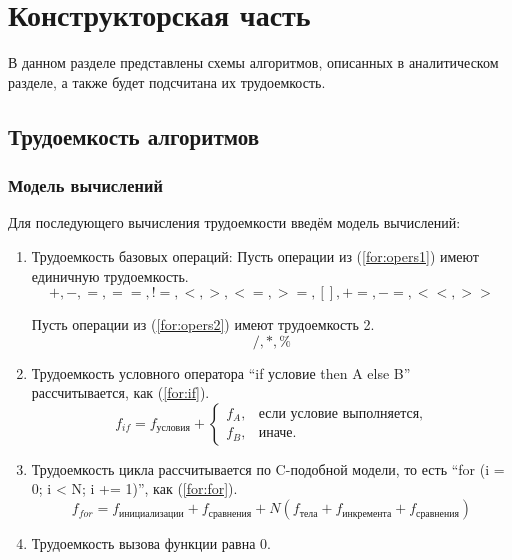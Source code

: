 \chapter{Конструкторская часть}
В данном разделе представлены схемы алгоритмов, описанных в
аналитическом разделе, а также будет подсчитана их трудоемкость.
\section{Трудоемкость алгоритмов}

\subsection{Модель вычислений}

Для последующего вычисления трудоемкости введём модель вычислений:
\begin{enumerate}
	\item Трудоемкость базовых операций:
	Пусть операции из (\ref{for:opers1}) имеют единичную трудоемкость.
	\begin{equation}
	\label{for:opers1}
	+, -, =, ==, !=, <, >, <=, >=, [], +=, -=, <<, >>
	\end{equation}
	
	Пусть операции из (\ref{for:opers2}) имеют трудоемкость 2.
	\begin{equation}
	\label{for:opers2}
	/, *, \%
	\end{equation}
		
	\item Трудоемкость условного оператора ``if условие then A else B'' рассчитывается, как (\ref{for:if}).
	\begin{equation}
	\label{for:if}
	f_{if} = f_{\text{условия}} +
	\begin{cases}
	f_A, & \text{если условие выполняется,}\\
	f_B, & \text{иначе.}
	\end{cases}
	\end{equation}

	\item Трудоемкость цикла рассчитывается по C-подобной модели, то есть ``for (i = 0; i < N; i += 1)'', как (\ref{for:for}).
	\begin{equation}
	\label{for:for}
	f_{for} = f_{\text{инициализации}} + f_{\text{сравнения}} + N(f_{\text{тела}} + f_{\text{инкремента}} + f_{\text{сравнения}})
	\end{equation}

	\item Трудоемкость вызова функции равна 0.


\end{enumerate}

